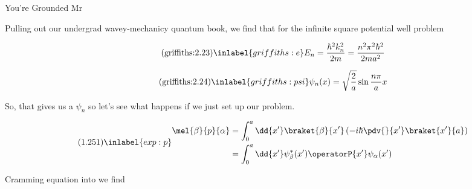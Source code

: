 \begin{answer}

  \begin{answerpart}{You're Grounded Mr}

    Pulling out our undergrad wavey-mechanicy quantum book, we find
    that for the infinite square potential well problem

    \begin{equation}
      \tag{griffiths:2.23}
      \inlabel{griffiths:e}
      E_n = \frac{\hbar^2k_n^2}{2m} = \frac{n^2\pi^2\hbar^2}{2ma^2}
    \end{equation}

    \begin{equation}
      \tag{griffiths:2.24}
      \inlabel{griffiths:psi}
      \psi_n(x) = \sqrt{\frac{2}{a}}\sin{\frac{n\pi}{a}x}
    \end{equation}

    So, that gives us a $\psi_n$ so let's see what happens if we just
    set up our problem.

    \begin{equation}
      \tag{1.251}
      \inlabel{exp:p}
      \begin{split}
        \mel{\beta}{p}{\alpha}
        &= \int_0^a \dd{x'} \braket{\beta}{x'}
        \left(
        -i \hbar \pdv{}{x'} \braket{x'}{a}
        \right)\\
        &= \int_0^a \dd{x'}
        \psi_{\beta}^{*}(x')
        \operatorP{x'}
        \psi_{\alpha}(x')\\
      \end{split}
    \end{equation}

    Cramming equation  into  we find
    

\end{answerpart}
\end{answer}
